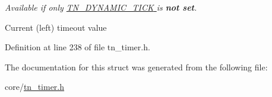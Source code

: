 {\itshape Available if only \hyperlink{tn__cfg__default_8h_aaee875834a86f961318c584095c366fe}{{\ttfamily T\+N\+\_\+\+D\+Y\+N\+A\+M\+I\+C\+\_\+\+T\+I\+CK} } is {\bfseries not set}.} 

Current (left) timeout value 

Definition at line 238 of file tn\+\_\+timer.\+h.



The documentation for this struct was generated from the following file\+:\begin{DoxyCompactItemize}
\item 
core/\hyperlink{tn__timer_8h}{tn\+\_\+timer.\+h}\end{DoxyCompactItemize}
